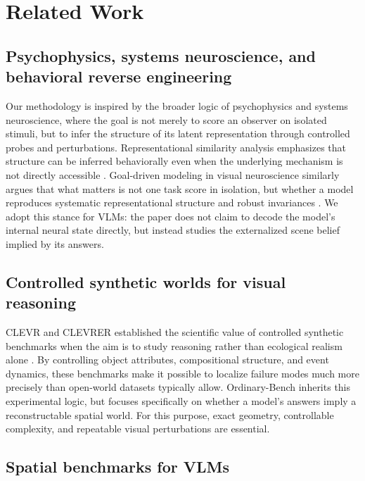 \section{Related Work}

\subsection{Psychophysics, systems neuroscience, and behavioral reverse engineering}

Our methodology is inspired by the broader logic of psychophysics and systems neuroscience, where the goal is not merely to score an observer on isolated stimuli, but to infer the structure of its latent representation through controlled probes and perturbations. Representational similarity analysis emphasizes that structure can be inferred behaviorally even when the underlying mechanism is not directly accessible \cite{kriegeskorte2008rsa}. Goal-driven modeling in visual neuroscience similarly argues that what matters is not one task score in isolation, but whether a model reproduces systematic representational structure and robust invariances \cite{yamins2016dicarlo}. We adopt this stance for VLMs: the paper does not claim to decode the model's internal neural state directly, but instead studies the externalized scene belief implied by its answers.

\subsection{Controlled synthetic worlds for visual reasoning}

CLEVR and CLEVRER established the scientific value of controlled synthetic benchmarks when the aim is to study reasoning rather than ecological realism alone \cite{johnson2017clevr,yi2020clevrer}. By controlling object attributes, compositional structure, and event dynamics, these benchmarks make it possible to localize failure modes much more precisely than open-world datasets typically allow. Ordinary-Bench inherits this experimental logic, but focuses specifically on whether a model's answers imply a reconstructable spatial world. For this purpose, exact geometry, controllable complexity, and repeatable visual perturbations are essential.

\subsection{Spatial benchmarks for VLMs}

